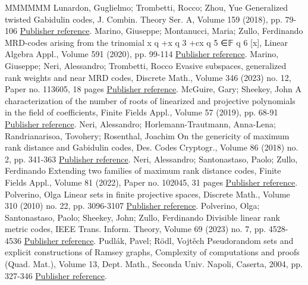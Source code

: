 \documentclass[11pt]{article}
\theoremstyle{definition}
\numberwithin{equation}{section}
\begin{document}
\begin{thebibliography}{MMMMMM}
 Lunardon, Guglielmo; Trombetti, Rocco; Zhou, Yue Generalized twisted Gabidulin codes, J. Combin. Theory Ser. A, Volume 159 (2018), pp. 79-106 \href{https://alco.centre-mersenne.org/articles/10.5802/alco.377/#lunardon2018generalized}{Publisher reference}.
 Marino, Giuseppe; Montanucci, Maria; Zullo, Ferdinando MRD-codes arising from the trinomial x q +x q 3  +cx q 5  ∈𝔽 q 6  [x], Linear Algebra Appl., Volume 591 (2020), pp. 99-114 \href{https://alco.centre-mersenne.org/articles/10.5802/alco.377/#marino2020mrd}{Publisher reference}.
 Marino, Giuseppe; Neri, Alessandro; Trombetti, Rocco Evasive subspaces, generalized rank weights and near MRD codes, Discrete Math., Volume 346 (2023) no. 12, Paper no. 113605, 18 pages \href{https://alco.centre-mersenne.org/articles/10.5802/alco.377/#marino2022evasive}{Publisher reference}.
 McGuire, Gary; Sheekey, John A characterization of the number of roots of linearized and projective polynomials in the field of coefficients, Finite Fields Appl., Volume 57 (2019), pp. 68-91 \href{https://alco.centre-mersenne.org/articles/10.5802/alco.377/#mcguire2019characterization}{Publisher reference}.
 Neri, Alessandro; Horlemann-Trautmann, Anna-Lena; Randrianarisoa, Tovohery; Rosenthal, Joachim On the genericity of maximum rank distance and Gabidulin codes, Des. Codes Cryptogr., Volume 86 (2018) no. 2, pp. 341-363 \href{https://alco.centre-mersenne.org/articles/10.5802/alco.377/#neri2018genericity}{Publisher reference}.
 Neri, Alessandro; Santonastaso, Paolo; Zullo, Ferdinando Extending two families of maximum rank distance codes, Finite Fields Appl., Volume 81 (2022), Paper no. 102045, 31 pages \href{https://alco.centre-mersenne.org/articles/10.5802/alco.377/#NPZ}{Publisher reference}.
 Polverino, Olga Linear sets in finite projective spaces, Discrete Math., Volume 310 (2010) no. 22, pp. 3096-3107 \href{https://alco.centre-mersenne.org/articles/10.5802/alco.377/#polverino2010linear}{Publisher reference}.
 Polverino, Olga; Santonastaso, Paolo; Sheekey, John; Zullo, Ferdinando Divisible linear rank metric codes, IEEE Trans. Inform. Theory, Volume 69 (2023) no. 7, pp. 4528-4536 \href{https://alco.centre-mersenne.org/articles/10.5802/alco.377/#polverino2023divisible}{Publisher reference}.
 Pudlák, Pavel; Rödl, Vojtěch Pseudorandom sets and explicit constructions of Ramsey graphs, Complexity of computations and proofs (Quad. Mat.), Volume 13, Dept. Math., Seconda Univ. Napoli, Caserta, 2004, pp. 327-346 \href{https://alco.centre-mersenne.org/articles/10.5802/alco.377/#pudlak2004pseudorandom}{Publisher reference}.

\end{thebibliography}
\end{document}
